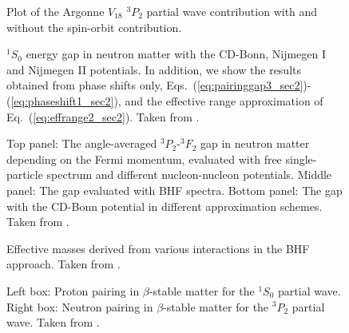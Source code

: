 \documentclass[preprint,rmp,aps,floatfix]{revtex4}
\begin{document}
\begin{figure}
\caption{Plot of the Argonne $V_{18}$ \cite{v18} 
$^3P_2$ partial wave contribution  
with and without the
spin-orbit contribution.
         \label{fig:tripletwaves}}
\end{figure} 


\begin{figure}
%
\caption{$^1S_0$ energy gap in neutron matter with the CD-Bonn, 
             Nijmegen I and Nijmegen II potentials. In addition, we 
             show the results obtained from phase shifts only, 
             Eqs.~(\ref{eq:pairinggap3_sec2})-(\ref{eq:phaseshift1_sec2}), 
             and the effective range approximation of 
             Eq.~(\ref{eq:effrange2_sec2}). Taken from \cite{eh98}.
             \label{fig:energygap_sec2}}
\end{figure}

\begin{figure}
\caption{Top panel: The angle-averaged $^3P_2$-$^3F_2$ gap in neutron matter
         depending on the Fermi momentum, evaluated with free 
         single-particle spectrum and different nucleon-nucleon potentials. 
         Middle panel: The gap evaluated with BHF spectra.
         Bottom panel: The gap with the CD-Bonn potential in different 
         approximation schemes. Taken from \cite{pair2}.\label{fig:gaps}}

\end{figure}

\begin{figure}
%
\caption{Effective masses derived from various interactions in 
         the BHF approach. Taken from \cite{pair2}.\label{fig:mstar}}
\end{figure}


\begin{figure}
      \caption{Left box: Proton pairing in $\beta$-stable matter for 
          the $^1S_0$ partial wave. Right box: Neutron pairing in 
          $\beta$-stable matter for the $^3P_2$
          partial wave. Taken from \cite{pair1}.}
     \label{fig:figgap}
\end{figure}
\end{document}
